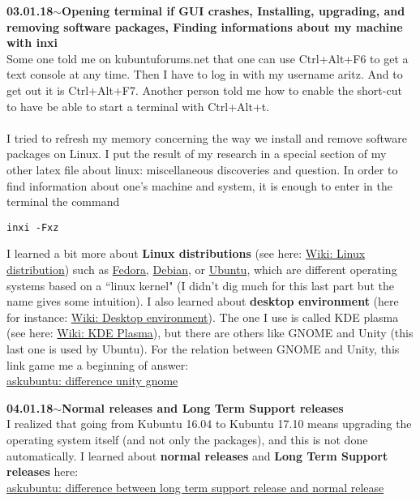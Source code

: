 \documentclass[11pt,a4paper]{article}
\newenvironment{loggentry}[2]%
{\noindent\textbf{#1}\hspace{1cm}$\mathbf{\sim}$\text{ }\textbf{#2}\\}{\vspace{0.5cm}}
\begin{document}
\begin{loggentry}{03.01.18}{Opening terminal if GUI crashes, Installing, upgrading, and removing software packages, Finding informations about my machine with inxi}
Some one told me on kubuntuforums.net that one can use Ctrl+Alt+F6 to get a text console at any time. Then I have to log in with my username aritz. And to get out it is Ctrl+Alt+F7. Another person told me how to enable the short-cut to have be able to start a terminal with Ctrl+Alt+t.\\
\\
I tried to refresh my memory concerning the way we install and remove software packages on Linux. I put the result of my research in a special section of my other latex file about linux: miscellaneous discoveries and question.
In order to find information about one's machine and system, it is enough to enter in the terminal the command
\begin{verbatim}
inxi -Fxz
\end{verbatim}
I learned a bit more about \textbf{Linux distributions} (see here: \href{https://en.wikipedia.org/wiki/Linux_distribution}{Wiki: Linux distribution}) such as \href{https://en.wikipedia.org/wiki/Fedora_(operating_system)}{Fedora}, \href{https://en.wikipedia.org/wiki/Debian}{Debian}, or \href{https://en.wikipedia.org/wiki/Ubuntu_(operating_system)}{Ubuntu}, which are different operating systems based on a ``linux kernel" (I didn't dig much for this last part but the name gives some intuition). I also learned about \textbf{desktop environment} (here for instance: \href{https://en.wikipedia.org/wiki/Desktop_environment}{Wiki: Desktop environment}). The one I use is called KDE plasma (see here: \href{https://en.wikipedia.org/wiki/KDE#Plasma_Workspaces}{Wiki: KDE Plasma}), but there are others like GNOME and Unity (this last one is used by Ubuntu). For the relation between GNOME and Unity, this link game me a beginning of answer:\\
\href{https://askubuntu.com/questions/333237/difference-between-unity-and-gnome#526867}{askubuntu: difference unity gnome}\\
\end{loggentry}

\begin{loggentry}{04.01.18}{Normal releases and Long Term Support releases}
I realized that going from Kubuntu 16.04 to Kubuntu 17.10 means upgrading the operating system itself (and not only the packages), and this is not done automatically. I learned about \textbf{normal releases} and \textbf{Long Term Support releases} here:\\
\href{https://askubuntu.com/questions/16366/whats-the-difference-between-a-long-term-support-release-and-a-normal-release}{askubuntu: difference between long term support release and normal release}\\
\end{loggentry}
\end{document}
